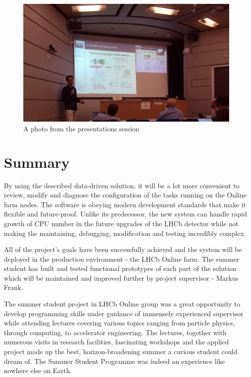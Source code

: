 \documentclass{customization}
\begin{document}
\begin{figure}[H]
\centering
    \includegraphics[scale=0.4]{images/Project_Presentation.jpg}
    \caption{A photo from the presentations session}
    \label{fig:presentation}
\end{figure}


\newpage
\section{Summary}
\hspace{0.6cm}


By using the described data-driven solution, it will be a lot more convenient to review, modify and diagnose the configuration of the tasks running on the Online farm nodes. The software is obeying modern development standards that make it flexible and future-proof.
Unlike its predecessor, the new system can handle rapid growth of CPU number in the future upgrades of the LHCb detector while not making the maintaining, debugging, modification and testing incredibly complex.
\newline

\noindent
All of the project's goals have been successfully achieved and the system will be deployed in the production environment - the LHCb Online farm. The summer student has built and tested functional prototypes of each part of the solution which will be maintained and improved further by project supervisor - Markus Frank.
\newline

\noindent
The summer student project in LHCb Online group was a great opportunity to develop programming skills under guidance of immensely experienced supervisor while attending lectures covering various topics ranging from particle physics, through computing, to accelerator engineering. The lectures, together with numerous visits in research facilities, fascinating workshops and the applied project made up the best, horizon-broadening summer a curious student could dream of.
\newline  \newline
The Summer Student Programme was indeed an experience like nowhere else on Earth.
\vspace{3cm}
\end{document}
